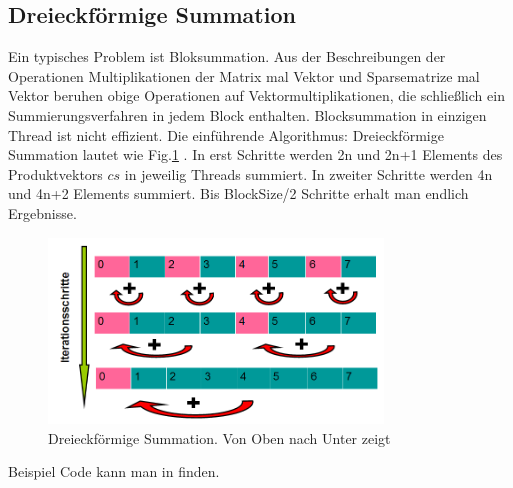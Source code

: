 

\subsection{Dreieckförmige Summation}
Ein typisches Problem ist Bloksummation. Aus der Beschreibungen der Operationen Multiplikationen der Matrix mal Vektor und Sparsematrize  mal Vektor beruhen obige Operationen auf Vektormultiplikationen, die schließlich ein Summierungsverfahren in jedem Block enthalten. Blocksummation in einzigen Thread ist nicht effizient. Die einführende Algorithmus: Dreieckförmige Summation lautet wie Fig.\ref{Dreieck} . In erst Schritte werden 2n und 2n+1 Elements des Produktvektors $cs$ in jeweilig Threads summiert. In zweiter Schritte werden 4n und 4n+2 Elements summiert. Bis BlockSize/2 Schritte erhalt man endlich Ergebnisse.

\begin{figure}[htbp]
\includegraphics[width=3.5in]{../xby/pic//dreieck}
\caption{\label{Dreieck}Dreieckförmige Summation. Von Oben nach Unter zeigt}
\end{figure}

Beispiel Code kann man in \cite{reduction} finden.

%
